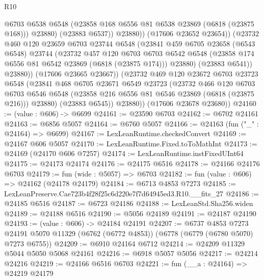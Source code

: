\begin{lexlean}{R10}
\begin{coremodule}
                      @6703
                      @6538
                      @6548
                      (@23858 @168 @6556 @81 @6538 @23869 (@6818 (@23875 @168)))
                      @23880)
                    (@23883 @6537))
                  @23880))
              (@17606 @23652 @23654))
            (@23732
              @460
              @120
              @23659
              @6703
              @23744
              @6548
              (@23841
                @459
                @6705
                @23658
                (@6543 @6548)
                @23744
                (@23732
                  @457
                  @120
                  @6703
                  @6703
                  @6542
                  @6548
                  (@23858 @174 @6556 @81 @6542 @23869 (@6818 (@23875 @174)))
                  @23880)
                (@23883 @6541))
              @23880))
          (@17606 @23665 @23667))
        (@23732
          @469
          @120
          @23672
          @6703
          @23723
          @6548
          (@23841
            @468
            @6705
            @23671
            @6549
            @23723
            (@23732
              @466
              @120
              @6703
              @6703
              @6546
              @6548
              (@23858 @216 @6556 @81 @6546 @23869 (@6818 (@23875 @216)))
              @23880)
            (@23883 @6545))
          @23880))
      (@17606 @23678 @23680))
@24160 := (value : @606) -> @6699
@24161 := @23590 @6703
@24162 := @6702 @24161
@24163 := @6856 @5057
@24164 := @6760 @5057
@24166 := @24163 (fun ("_" : @24164) => @6699)
@24167 := LexLeanRuntime.checkedConvert
@24169 := @24167 @606 @5057
@24170 := LexLeanRuntime.Fixed.toToMathInt
@24173 := @24169 (@24170 @606 @7257)
@24174 := LexLeanRuntime.instFixedUInt64
@24175 := @24173 @24174
@24176 := @24175 @6516
@24178 := @24166 @24176 @6703
@24179 := fun (wide : @5057) => @6703
@24182 := fun (value : @606) => @24162 (@24178 @24179)
@24184 := @6713 @4853 @7273
@24185 := LexLeanPreserve.Cae723b4f28f25c6d220e7f7d64945ed3.R10.__fits_27
@24186 := @24185 @6516
@24187 := @6723 @24186
@24188 := LexLeanStd.Sha256.widen
@24189 := @24188 @6516
@24190 := @5056 @24189
@24191 := @24187 @24190
@24193 := (value : @606) -> @24184 @24191
@24207 := @6737
    @4853
    @7273
    @24191
    @5070
    @11329
    (@6762 (@6772 @4853))
    (@6778 (@6779 (@6780 @5070) @7273 @6755))
@24209 := @6910 @24164 @6712
@24214 := @24209 @11329 @5044 @5050 @5068 @24161
@24216 := @6918 @5057 @5056
@24217 := @24214 @24216
@24219 := @24166 @6516 @6703
@24221 := fun (__a : @24164) => @24219 @24179

\end{coremodule}
\end{lexlean}
